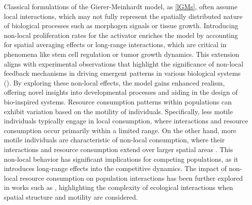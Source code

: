 \documentclass[leqno,12pt]{article}
\numberwithin{equation}{section}
\begin{document}
 Classical formulations of the Gierer-Meinhardt model, as \eqref{lGMs}, often assume local interactions, which may not fully represent the spatially distributed nature of biological processes such as morphogen signals or tissue growth. Introducing non-local proliferation rates for the activator enriches the model by accounting for spatial averaging effects or long-range interactions, which are critical in phenomena like stem cell regulation or tumor growth dynamics. This extension aligns with experimental observations that highlight the significance of non-local feedback mechanisms in driving emergent patterns in various biological systems (\cite{Mein82, Mur03}). By exploring these non-local effects, the model gains enhanced realism, offering novel insights into developmental processes and aiding in the design of bio-inspired systems. Resource  consumption patterns within populations can exhibit variation based on the motility of individuals. Specifically, less motile individuals typically engage in local consumption, where interactions and resource consumption occur primarily within a limited range. On the other hand, more motile individuals are characteristic of non-local consumption, where their interactions and resource consumption extend over larger spatial areas \cite{Atamas2012_Non-localCompetitionResources}. This non-local behavior has significant implications for competing populations, as it introduces long-range effects into the competitive dynamics. The impact of non-local resource consumption on population interactions has been further explored in works such as \cite{BaylissVolpert2015_CompetingPopulationsnon-local}, highlighting the complexity of ecological interactions when spatial structure and motility are considered. 
\end{document}
